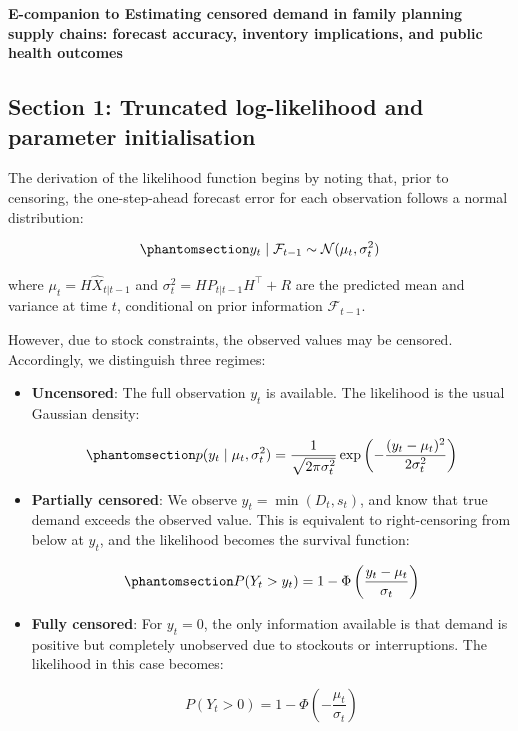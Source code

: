 \documentclass[
  authoryear,
  doubleblind,
  3p]{elsarticle}
\begin{document}
\begingroup
\centering
\singlespacing
\Large\bfseries
E-companion to Estimating censored demand in family planning supply
chains: forecast accuracy, inventory implications, and public health
outcomes\par
\endgroup
\vspace{0.8em}

\subsection{Section 1: Truncated log-likelihood and parameter
initialisation}\label{sec-appendix_wp2_1}

The derivation of the likelihood function begins by noting that, prior
to censoring, the one-step-ahead forecast error for each observation
follows a normal distribution:

\begin{equation}\phantomsection\label{eq-wp2_a1}{
y_t \mid \mathcal{F}_{t-1} \sim \mathcal{N}(\mu_t, \sigma_t^2)
}\end{equation}

where \(\mu_t = H \hat{X}_{t|t-1}\) and
\(\sigma_t^2 = H P_{t|t-1} H^\top + R\) are the predicted mean and
variance at time \(t\), conditional on prior information
\(\mathcal{F}_{t-1}\).

However, due to stock constraints, the observed values may be censored.
Accordingly, we distinguish three regimes:

\begin{itemize}
\item
  \textbf{Uncensored}: The full observation \(y_t\) is available. The
  likelihood is the usual Gaussian density:

  \begin{equation}\phantomsection\label{eq-wp2_a2}{
  p(y_t \mid \mu_t, \sigma_t^2) = \frac{1}{\sqrt{2\pi \sigma_t^2}} \exp\left( -\frac{(y_t - \mu_t)^2}{2\sigma_t^2} \right)
  }\end{equation}
\item
  \textbf{Partially censored}: We observe \(y_t = \min(D_t, s_t)\), and
  know that true demand exceeds the observed value. This is equivalent
  to right-censoring from below at \(y_t\), and the likelihood becomes
  the survival function:

  \begin{equation}\phantomsection\label{eq-wp2_a3}{
  P(Y_t > y_t) = 1 - \Phi\left( \frac{y_t - \mu_t}{\sigma_t} \right)
  }\end{equation}
\item
  \textbf{Fully censored}: For \(y_t = 0\), the only information
  available is that demand is positive but completely unobserved due to
  stockouts or interruptions. The likelihood in this case becomes:

  \[
  P(Y_t > 0) = 1 - \Phi\left( -\frac{\mu_t}{\sigma_t} \right)
  \]
\end{itemize}
\end{document}
